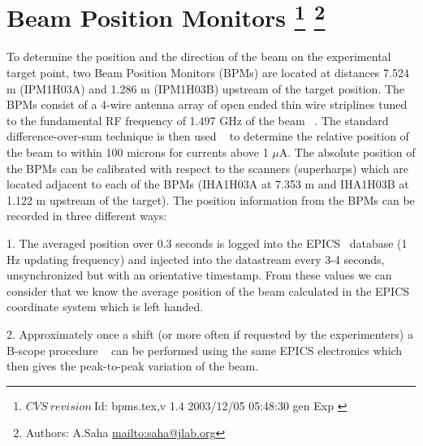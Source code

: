 \section[Beam Position Monitors]{Beam Position Monitors
\footnote{
  $CVS~revision~ $Id: bpms.tex,v 1.4 2003/12/05 05:48:30 gen Exp $ $
}
\footnote{Authors: A.Saha \url{mailto:saha@jlab.org}}
}

To determine the position and the direction of the beam on the experimental 
target point, two Beam Position Monitors (BPMs) are located at distances 7.524 m 
(IPM1H03A) and 1.286 m (IPM1H03B) upstream of the target position. 
The BPMs consist of a 4-wire antenna array of open ended thin wire striplines 
tuned to the fundamental RF frequency of 1.497 GHz of the beam ~\cite{bi:bar90}. The 
standard difference-over-sum technique is then used ~\cite{bi:HW} to determine the 
relative position of the beam to within 100 microns for currents
above 1 $\mu $A. The absolute  position of the BPMs can be calibrated with respect to the 
scanners (superharps) which are located adjacent to each of the BPMs (IHA1H03A 
at 7.353 m and IHA1H03B at 1.122 m upstream of the target). 
The position information from the 
BPMs can be recorded in three different ways:


1. The averaged position over 0.3 seconds is logged into the EPICS~\cite{EPICSwww} database (1 
Hz updating frequency) and injected into the datastream every 3-4 seconds, 
unsynchronized but with an orientative timestamp. From these values we can 
consider that we know the average position of the beam calculated in the EPICS 
coordinate system which is left handed.

\vskip 0.5cm

2. Approximately once a shift (or more often if requested by the experimenters) 
a B-scope procedure ~\cite{bi:TP} can be performed using the same EPICS electronics 
which then gives the peak-to-peak variation of the beam.

\vskip 0.5cm

